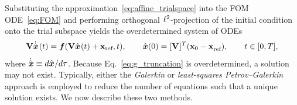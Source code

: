 \documentclass[3p,computermodern,10pt]{elsarticle}
\begin{document}
Substituting the approximation~\eqref{eq:affine_trialspace} into the FOM ODE~\eqref{eq:FOM} and performing orthogonal
$\ell^2$-projection of the initial condition onto the trial subspace yields
the overdetermined system of ODEs
\begin{equation}\label{eq:g_truncation}
\mathbf {V} \dot{\hat{ \boldsymbol x}}^{}(t) = \boldsymbol f(\mathbf {V}
\hat{ \boldsymbol x}^{}(t) + \mathbf{x}_\text{ref},t ), \qquad \hat{ \boldsymbol x}(0) = [\mathbf {V}^{}]^T( {{\mathbf{x}}_0} - \mathbf{x}_\text{ref}^{}),
	\qquad t \in [0,T],
\end{equation}
where $\dot{\hat{ \boldsymbol x}}\equiv {d \hat{ \boldsymbol x}}/{d\tau}$.
Because Eq.~\eqref{eq:g_truncation} is overdetermined, a solution may not
exist. Typically, either the \textit{Galerkin} or \textit{least-squares
Petrov--Galerkin} approach is employed to reduce the number of equations
such that a unique solution exists. We now describe these two methods.
\end{document}
